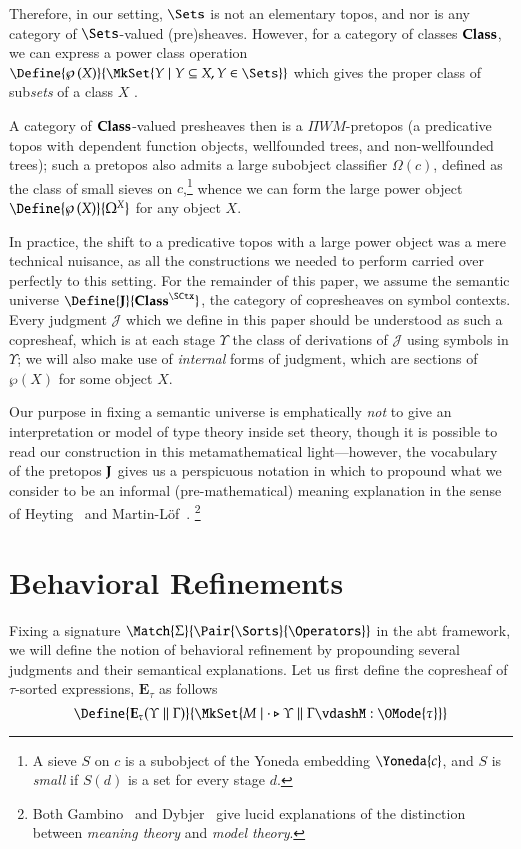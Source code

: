 \documentclass[11pt]{article}
\theoremstyle{definition}
\theoremstyle{notation}
\theoremstyle{remark}
\numberwithin{equation}{section}
\newcommand\Pow[1]{\wp\left(#1\right)}
\newcommand\IsAbtUnmoded[5]{
  #1\triangleright%
  #2\parallel%
  #3\vdash%
  #4:\OMode{#5}%
}
\newcommand\Exprs{\mathbf{E}}
\begin{document}
Therefore, in our setting, $\Sets$ is not an elementary topos, and nor is any
category of $\Sets$-valued (pre)sheaves. However, for a category of classes
$\mathbf{Class}$, we can express a power class operation
$\Define{\Pow{X}}{\MkSet{Y\mid Y\subseteq X, Y\in\Sets}}$ which gives the
proper class of sub\emph{sets} of a class $X$ \cite{gambino:2002}.

A category of $\mathbf{Class}$-valued presheaves then is a $\Pi W M$-pretopos (a
predicative topos with dependent function objects, wellfounded trees, and
non-wellfounded trees); such a pretopos also admits a large subobject
classifier $\Omega(c)$, defined as the class of small sieves on
$c$,\footnote{A sieve $S$ on $c$ is a subobject of the Yoneda
embedding $\Yoneda{c}$, and $S$ is \emph{small} if $S(d)$ is a set for every
stage $d$.} whence we can form the large power object
$\Define{\Pow{X}}{\Omega^X}$ for any object $X$.

In practice, the shift to a predicative topos with a large power object was a
mere technical nuisance, as all the constructions we needed to perform carried
over perfectly to this setting. For the remainder of this paper, we assume the
semantic universe $\Define{\SemU}{\Classes^\SCtx}$, the category of
copresheaves on symbol contexts. Every judgment $\mathcal{J}$ which we define
in this paper should be understood as such a copresheaf, which is at each stage
$\Upsilon$ the class of derivations of $\mathcal{J}$ using symbols in
$\Upsilon$; we will also make use of \emph{internal} forms of judgment, which
are sections of $\Pow{X}$ for some object $X$.

Our purpose in fixing a semantic universe is emphatically \emph{not} to give an
interpretation or model of type theory inside set theory, though it is possible
to read our construction in this metamathematical light---however, the
vocabulary of the pretopos $\mathbf{J}$ gives us a perspicuous notation in which to
propound what we consider to be an informal (pre-mathematical) meaning
explanation in the sense of Heyting~\cite{heyting:1956} and
Martin-L\"of~\cite{martin-lof:1979}.
\footnote{
  Both Gambino~\cite{gambino:2002} and Dybjer~\cite{dybjer:2012} give lucid
  explanations of the distinction between \emph{meaning theory} and \emph{model theory}.
}

\section{Behavioral Refinements}

Fixing a signature $\Match{\Sigma}{\Pair{\Sorts}{\Operators}}$ in the abt
framework, we will define the notion of behavioral refinement by propounding
several judgments and their semantical explanations. Let us first define the
copresheaf of $\tau$-sorted expressions, $\Exprs_\tau$ as follows
\[
  \Define{
    \Exprs_\tau(\Upsilon\parallel\Gamma)
  }{
    \MkSet{M \mid \IsAbtUnmoded{\cdot}{\Upsilon}{\Gamma}{M}{\tau}}
  }
\]
\end{document}
